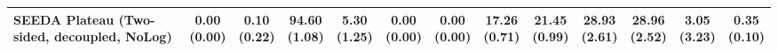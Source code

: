 \begin{table}[H]
{\begin{tabular}{l|cccccc|cccccc}
SEEDA Plateau (Two-sided, decoupled, NoLog) & \makecell{0.00 \\ (0.00)} & \makecell{0.10 \\ (0.22)} & {\cellcolor[HTML]{C8E6C9}} \bfseries \makecell{94.60 \\ (1.08)} & \makecell{5.30 \\ (1.25)} & \makecell{0.00 \\ (0.00)} & \makecell{0.00 \\ (0.00)} & \makecell{17.26 \\ (0.71)} & \makecell{21.45 \\ (0.99)} & {\cellcolor[HTML]{C8E6C9}} \makecell{28.93 \\ (2.61)} & \bfseries \makecell{28.96 \\ (2.52)} & \makecell{3.05 \\ (3.23)} & \makecell{0.35 \\ (0.10)} \\
\bottomrule
\end{tabular}
}%
\end{table}
